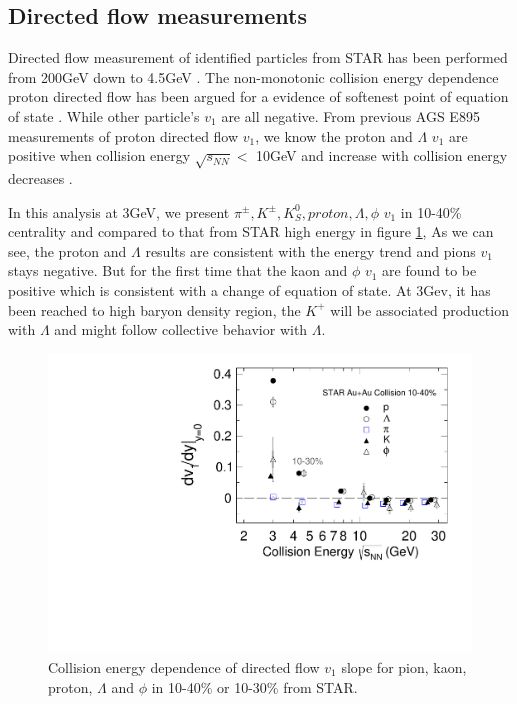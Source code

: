 \clearpage
\newpage
\subsection{Directed flow measurements}

Directed flow measurement of identified particles from STAR has been performed from 200GeV down to 4.5GeV \cite{Adamczyk:2014ipa, Adamczyk:2017nxg, Adam:2020pla}. The non-monotonic collision energy dependence proton  directed flow has been argued for a evidence of softenest point of equation of state \cite{Hung:1994eq, Konchakovski:2014gda, Nara:2016phs}. While other particle's $v_{1}$ are all negative. From previous AGS E895 measurements of proton directed flow $v_{1}$, we know the proton and $\Lambda$ $v_{1}$ are positive when collision energy $\sqrt{s_{NN}} <$ 10GeV and increase with collision energy decreases \cite{Liu:2000am}.  

In this analysis at 3GeV, we present $\pi^{\pm}, K^{\pm}, K^{0}_{S}, proton, \Lambda, \phi$ $v_{1}$ in 10-40\% centrality and compared to that from STAR high energy
 in figure \ref{fig:v1_energy}, As we can see, the proton and $\Lambda$ results are consistent with the energy trend and pions $v_{1}$ stays negative. But for the first time that the kaon and $\phi$ $v_{1}$ are found to be positive which is consistent with a change of equation of state. At 3Gev, it has been reached to high baryon density region, the $K^{+}$ will be associated production with $\Lambda$ and might follow collective behavior with $\Lambda$.


\begin{figure}
    \centering
    \includegraphics[scale=0.5]{FXT3gev/chapter4/fig/v1_energy.pdf}
    \caption{Collision energy dependence of directed flow $v_{1}$ slope for pion, kaon, proton, $\Lambda$ and $\phi$ in 10-40\% or 10-30\% from STAR.} 
    \label{fig:v1_energy}
\end{figure}

